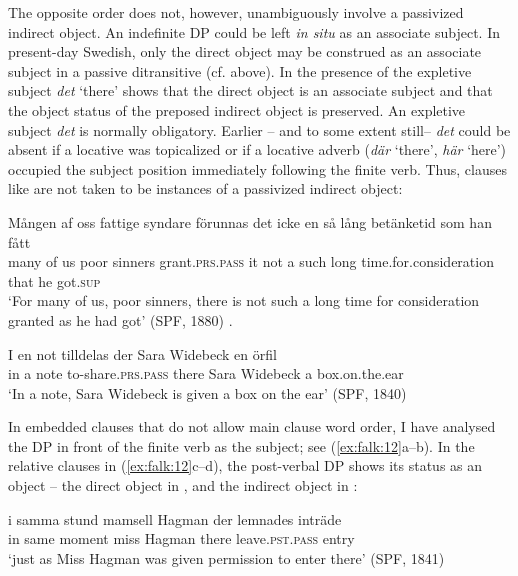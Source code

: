 \documentclass[output=paper]{langscibook}
\begin{document}
The opposite order does not, however, unambiguously involve a passivized indirect object. An indefinite DP could be left \textit{in situ} as an associate subject. In present-day Swedish, only the direct object may be construed as an associate subject in a passive ditransitive (cf.  above). In  the presence of {the expletive subject \textit{det} ‘there’} shows that the direct object is an associate subject and that the object status of the preposed indirect object is preserved. An expletive subject \textit{det} is normally obligatory. Earlier – and to some extent still– \textit{det} could be absent if a locative was topicalized or if a locative adverb (\textit{där} ‘there’, \textit{här} ‘here’) occupied the subject position immediately following the finite verb. Thus, clauses like  are not taken to be instances of a passivized indirect object:

\ea%
    \label{ex:falk:11}
\ea\label{ex:falk:11a}
\gll Mången  af  oss  fattige  syndare  förunnas      det  icke  en  så    lång  betänketid            som  han  fått\\
many    of  us    poor    sinners    grant\textsc{.prs}.\textsc{pass}     it    not  a  such  long      time.for.consideration  that  he    got\textsc{.sup}\footnotemark{}\\
\glt ‘For many of us, poor sinners, there is not such a long time for consideration granted as he had got’ (SPF, 1880)
.

\ex\label{ex:falk:11b}
\gll I  en  not  tilldelas            der  Sara  Widebeck  en  örfil\\
      in  a  note  to-share\textsc{.prs}.\textsc{pass}    there  Sara  Widebeck  a  box.on.the.ear\\
\glt ‘In a note, Sara Widebeck is given a box on the ear’ (SPF, 1840)
\z
\z


In embedded clauses that do not allow main clause word order, I have analysed the DP in front of the finite verb as the subject; see (\ref{ex:falk:12}a–b). In the relative clauses in (\ref{ex:falk:12}c–d), the post-verbal DP shows its status as an object – the direct object in , and the indirect object in :

\ea%
    \label{ex:falk:12}
\ea\label{ex:falk:12a}
\gll i  samma  stund    mamsell  Hagman  der    lemnades      inträde\\
      in  same    moment miss    Hagman  there  leave\textsc{.pst}.\textsc{pass}     entry\\
\glt ‘just as Miss Hagman was given permission to enter there’ (SPF, 1841)
\end{document}
